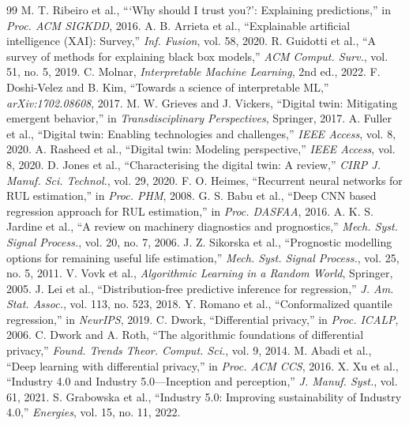 \documentclass[letterpaper, 10 pt, conference]{ieeeconf}
\begin{document}
\begin{thebibliography}{99}
 M. T. Ribeiro et al., ```Why should I trust you?': Explaining predictions,'' in \emph{Proc. ACM SIGKDD}, 2016.
 A. B. Arrieta et al., ``Explainable artificial intelligence (XAI): Survey,'' \emph{Inf. Fusion}, vol. 58, 2020.
 R. Guidotti et al., ``A survey of methods for explaining black box models,'' \emph{ACM Comput. Surv.}, vol. 51, no. 5, 2019.
 C. Molnar, \emph{Interpretable Machine Learning}, 2nd ed., 2022.
 F. Doshi-Velez and B. Kim, ``Towards a science of interpretable ML,'' \emph{arXiv:1702.08608}, 2017.
 M. W. Grieves and J. Vickers, ``Digital twin: Mitigating emergent behavior,'' in \emph{Transdisciplinary Perspectives}, Springer, 2017.
 A. Fuller et al., ``Digital twin: Enabling technologies and challenges,'' \emph{IEEE Access}, vol. 8, 2020.
 A. Rasheed et al., ``Digital twin: Modeling perspective,'' \emph{IEEE Access}, vol. 8, 2020.
 D. Jones et al., ``Characterising the digital twin: A review,'' \emph{CIRP J. Manuf. Sci. Technol.}, vol. 29, 2020.
 F. O. Heimes, ``Recurrent neural networks for RUL estimation,'' in \emph{Proc. PHM}, 2008.
 G. S. Babu et al., ``Deep CNN based regression approach for RUL estimation,'' in \emph{Proc. DASFAA}, 2016.
 A. K. S. Jardine et al., ``A review on machinery diagnostics and prognostics,'' \emph{Mech. Syst. Signal Process.}, vol. 20, no. 7, 2006.
 J. Z. Sikorska et al., ``Prognostic modelling options for remaining useful life estimation,'' \emph{Mech. Syst. Signal Process.}, vol. 25, no. 5, 2011.
 V. Vovk et al., \emph{Algorithmic Learning in a Random World}, Springer, 2005.
 J. Lei et al., ``Distribution-free predictive inference for regression,'' \emph{J. Am. Stat. Assoc.}, vol. 113, no. 523, 2018.
 Y. Romano et al., ``Conformalized quantile regression,'' in \emph{NeurIPS}, 2019.
 C. Dwork, ``Differential privacy,'' in \emph{Proc. ICALP}, 2006.
 C. Dwork and A. Roth, ``The algorithmic foundations of differential privacy,'' \emph{Found. Trends Theor. Comput. Sci.}, vol. 9, 2014.
 M. Abadi et al., ``Deep learning with differential privacy,'' in \emph{Proc. ACM CCS}, 2016.
 X. Xu et al., ``Industry 4.0 and Industry 5.0---Inception and perception,'' \emph{J. Manuf. Syst.}, vol. 61, 2021.
 S. Grabowska et al., ``Industry 5.0: Improving sustainability of Industry 4.0,'' \emph{Energies}, vol. 15, no. 11, 2022.

\end{thebibliography}
\end{document}
